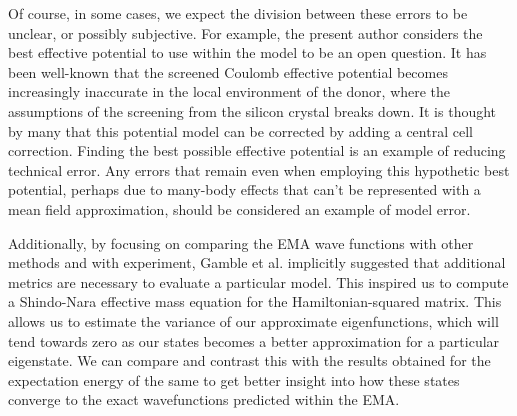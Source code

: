 Of course, in some cases, we expect the division between these errors to be
unclear, or possibly subjective. For example, the present author considers the
best effective potential to use within the model to be an open question. It has
been well-known that the screened Coulomb effective potential becomes
increasingly inaccurate in the local environment of the donor, where the
assumptions of the screening from the silicon crystal breaks down. It is thought
by many that this potential model can be corrected by adding a central cell
correction. Finding the best possible effective potential is an example of
reducing technical error. Any errors that remain even when employing this
hypothetic best potential, perhaps due to many-body effects that can't be
represented with a mean field approximation, should be considered an example of model error.

Additionally, by focusing on comparing the EMA wave functions with other methods
and with experiment, Gamble et al. implicitly suggested that additional metrics
are necessary to evaluate a particular model. This inspired us to compute a
Shindo-Nara effective mass equation for the Hamiltonian-squared matrix. This
allows us to estimate the variance of our approximate eigenfunctions, which will
tend towards zero as our states becomes a better approximation for a particular
eigenstate. We can compare and contrast this with the results obtained for the
expectation energy of the same to get better insight into how these states
converge to the exact wavefunctions predicted within the EMA.